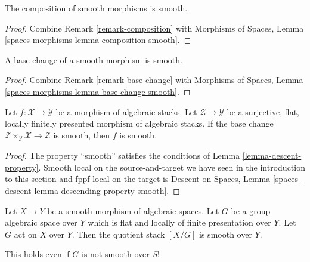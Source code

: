\begin{lemma}
\label{lemma-composition-smooth}
The composition of smooth morphisms is smooth.
\end{lemma}

\begin{proof}
Combine
Remark \ref{remark-composition}
with
Morphisms of Spaces, Lemma
\ref{spaces-morphisms-lemma-composition-smooth}.
\end{proof}

\begin{lemma}
\label{lemma-base-change-smooth}
A base change of a smooth morphism is smooth.
\end{lemma}

\begin{proof}
Combine
Remark \ref{remark-base-change}
with
Morphisms of Spaces, Lemma
\ref{spaces-morphisms-lemma-base-change-smooth}.
\end{proof}

\begin{lemma}
\label{lemma-descent-smooth}
Let $f : \mathcal{X} \to \mathcal{Y}$ be a morphism of algebraic stacks.
Let $\mathcal{Z} \to \mathcal{Y}$ be a surjective, flat, locally finitely
presented morphism of algebraic stacks. If the base change
$\mathcal{Z} \times_\mathcal{Y} \mathcal{X} \to \mathcal{Z}$
is smooth, then $f$ is smooth.
\end{lemma}

\begin{proof}
The property ``smooth''
satisfies the conditions of Lemma \ref{lemma-descent-property}.
Smooth local on the source-and-target we have seen in the
introduction to this section and fppf local on the target is
Descent on Spaces, Lemma
\ref{spaces-descent-lemma-descending-property-smooth}.
\end{proof}

\begin{lemma}
\label{lemma-smooth-quotient-stack}
Let $X \to Y$ be a smooth morphism of algebraic spaces.
Let $G$ be a group algebraic space over $Y$ which is flat
and locally of finite presentation over $Y$. Let $G$ act on $X$ over $Y$.
Then the quotient stack $[X/G]$ is smooth over $Y$.
\end{lemma}

\noindent
This holds even if $G$ is not smooth over $S$!

